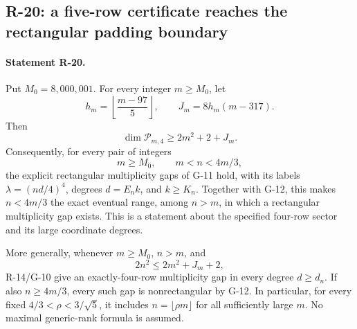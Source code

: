 \documentclass[11pt,a4paper]{article}
\theoremstyle{definition}\newtheorem{definition}{Definition}
\begin{document}
\subsection{R-20: a five-row certificate reaches the rectangular padding boundary}

\paragraph{Statement R-20.}
Put $M_0=8{,}000{,}001$. For every integer $m\geq M_0$, let
\[
 h_m=\left\lfloor\frac{m-97}{5}\right\rfloor,
 \qquad J_m=8h_m(m-317).
\]
Then
\begin{equation}\label{R20:dimension}
 \dim\mathcal P_{m,4}\geq2m^2+2+J_m.
\end{equation}
Consequently, for every pair of integers
\begin{equation}\label{R20:rectrange}
 m\geq M_0,\qquad m<n<4m/3,
\end{equation}
the explicit rectangular multiplicity gaps of G-11 hold, with its
labels $\lambda=(nd/4)^4$, degrees $d=E_nk$, and $k\geq K_n$.
Together with G-12, this makes $n<4m/3$ the exact eventual range,
among $n>m$, in which a rectangular multiplicity gap exists.
This is a statement about the specified four-row sector and its
large coordinate degrees.

More generally, whenever $m\geq M_0$, $n>m$, and
\begin{equation}\label{R20:allrange}
 2n^2\leq2m^2+J_m+2,
\end{equation}
R-14/G-10 give an exactly-four-row multiplicity gap in every degree
$d\geq d_n$. If also $n\geq4m/3$, every such gap is nonrectangular
by G-12. In particular, for every fixed $4/3<\rho<3/\sqrt5$, it includes
$n=\lfloor\rho m\rfloor$ for all sufficiently large $m$.
No maximal generic-rank formula is assumed.
\end{document}
